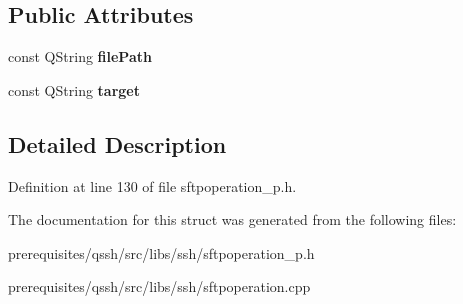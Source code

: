 \subsection*{Public Attributes}
\begin{DoxyCompactItemize}
\item 
\mbox{\label{struct_q_ssh_1_1_internal_1_1_sftp_create_link_afcbbdf008739d120efcc15ade5222efc}} 
const Q\+String {\bfseries file\+Path}
\item 
\mbox{\label{struct_q_ssh_1_1_internal_1_1_sftp_create_link_a42129c27c394ea06edc8e4d8762bb9ca}} 
const Q\+String {\bfseries target}
\end{DoxyCompactItemize}


\subsection{Detailed Description}


Definition at line 130 of file sftpoperation\+\_\+p.\+h.



The documentation for this struct was generated from the following files\+:\begin{DoxyCompactItemize}
\item 
prerequisites/qssh/src/libs/ssh/sftpoperation\+\_\+p.\+h\item 
prerequisites/qssh/src/libs/ssh/sftpoperation.\+cpp\end{DoxyCompactItemize}
